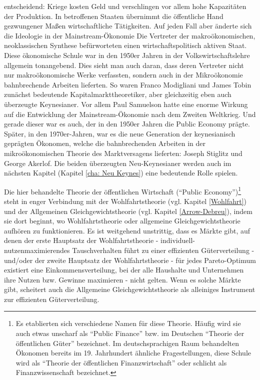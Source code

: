 entscheidend: Kriege kosten Geld und verschlingen vor allem hohe Kapazitäten der Produktion. In betroffenen Staaten übernimmt die öffentliche Hand gezwungener Maßen wirtschaftliche Tätigkeiten. Auf jeden Fall aber änderte sich die Ideologie in der Mainstream-Ökonomie Die Vertreter der makroökonomischen, neoklassischen Synthese befürworteten einen wirtschaftspolitisch aktiven Staat. Diese ökonomische Schule war in den 1950er Jahren in der Volkswirtschaftslehre allgemein tonangebend. Dies sieht man auch daran, dass deren Vertreter nicht nur makroökonomische Werke verfassten, sondern auch in der Mikroökonomie bahnbrechende Arbeiten lieferten. So waren Franco Modigliani und James Tobin zunächst bedeutende Kapitalmarkttheoretiker, aber gleichzeitig eben auch überzeugte Keynesianer. Vor allem Paul Samuelson hatte eine enorme Wirkung auf die Entwicklung der Mainstream-Ökonomie nach dem Zweiten Weltkrieg. Und gerade dieser war es auch, der in den 1950er Jahren die Public Economy prägte. Später, in den 1970er-Jahren, war es die neue Generation der keynesianisch geprägten Ökonomen, welche die bahnbrechenden Arbeiten in der mikroökonomischen Theorie des Marktversagens lieferten: Joseph Stiglitz und George Akerlof. Die beiden überzeugten Neu-Keynesianer werden auch im nächsten Kapitel (Kapitel \ref{cha: Neu Keynes}) eine bedeutende Rolle spielen.

Die hier behandelte Theorie der öffentlichen Wirtschaft ("`Public Economy"')\footnote{Es etablierten sich verschiedene Namen für diese Theorie. Häufig wird sie auch etwas unscharf als "`Public Finance"' bzw. im Deutschen "`Theorie der öffentlichen Güter"' bezeichnet. Im deutschsprachigen Raum behandelten Ökonomen bereits im 19. Jahrhundert ähnliche Fragestellungen, diese Schule wird als "`Theorie der öffentlichen Finanzwirtschaft"' oder schlicht als Finanzwissenschaft bezeichnet.} steht in enger Verbindung mit der Wohlfahrtstheorie (vgl. Kapitel \ref{Wohlfahrt}) und der Allgemeinen Gleichgewichtstheorie (vgl. Kapitel \ref{Arrow-Debreu}), indem sie dort beginnt, wo Wohlfahrtstheorie oder allgemeine Gleichgewichtstheorie aufhören zu funktionieren. Es ist weitgehend unstrittig, dass es Märkte gibt, auf denen der erste Hauptsatz der Wohlfahrtstheorie - individuell-nutzenmaximierendes Tauschverhalten führt zu einer effizienten Güterverteilung - und/oder der zweite Hauptsatz der Wohlfahrtstheorie - für jedes Pareto-Optimum existiert eine Einkommensverteilung, bei der alle Haushalte und Unternehmen ihre Nutzen bzw. Gewinne maximieren - nicht gelten. Wenn es solche Märkte gibt, scheitert auch die Allgemeine Gleichgewichtstheorie als alleiniges Instrument zur effizienten Güterverteilung.

